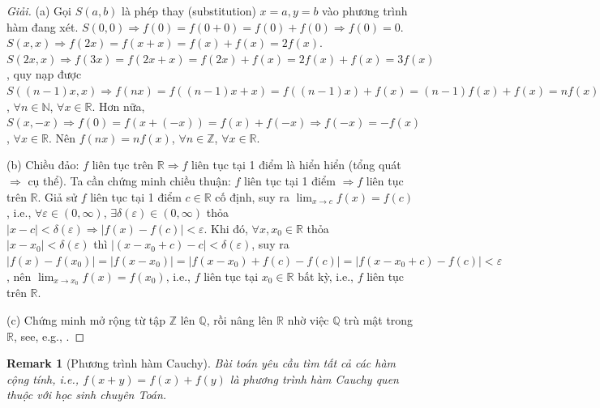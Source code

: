 \documentclass{article}
\newtheorem{remark}{Remark}
\begin{document}
\begin{proof}[Giải]
	(a) Gọi $S(a,b)$ là phép thay (substitution) $x = a,y = b$ vào phương trình hàm đang xét. $S(0,0)\Rightarrow f(0) = f(0 + 0) = f(0) + f(0)\Rightarrow f(0) = 0$. $S(x,x)\Rightarrow f(2x) = f(x + x) = f(x) + f(x) = 2f(x)$. $S(2x,x)\Rightarrow f(3x) = f(2x + x) = f(2x) + f(x) = 2f(x) + f(x) = 3f(x)$, quy nạp được $S((n - 1)x,x)\Rightarrow  f(nx) = f((n - 1)x + x) = f((n - 1)x) + f(x) = (n - 1)f(x) + f(x) = nf(x)$, $\forall n\in\mathbb{N}$, $\forall x\in\mathbb{R}$. Hơn nữa, $S(x,-x)\Rightarrow f(0) = f(x + (-x)) = f(x) + f(-x)\Rightarrow f(-x) = -f(x)$, $\forall x\in\mathbb{R}$. Nên $f(nx) = nf(x)$, $\forall n\in\mathbb{Z}$, $\forall x\in\mathbb{R}$.
	\item(b) Chiều đảo: $f$ liên tục trên $\mathbb{R}\Rightarrow f$ liên tục tại 1 điểm là hiển hiển (tổng quát $\Rightarrow$ cụ thể). Ta cần chứng minh chiều thuận: $f$ liên tục tại 1 điểm $\Rightarrow f$ liên tục trên $\mathbb{R}$. Giả sử $f$ liên tục tại 1 điểm $c\in\mathbb{R}$ cố định, suy ra $\lim_{x\to c} f(x) = f(c)$, i.e., $\forall\varepsilon\in(0,\infty)$, $\exists\delta(\varepsilon)\in(0,\infty)$ thỏa $|x - c| < \delta(\varepsilon)\Rightarrow|f(x) - f(c)| < \varepsilon$. Khi đó, $\forall x,x_0\in\mathbb{R}$ thỏa $|x - x_0| < \delta(\varepsilon)$ thì $|(x - x_0 + c) - c| < \delta(\varepsilon)$, suy ra $|f(x) - f(x_0)| = |f(x - x_0)| = |f(x - x_0) + f(c) - f(c)| = |f(x - x_0 + c) - f(c)| < \varepsilon$, nên $\lim_{x\to x_0} f(x) = f(x_0)$, i.e., $f$ liên tục tại $x_0\in\mathbb{R}$ bất kỳ, i.e., $f$ liên tục trên $\mathbb{R}$.
	\item(c) Chứng minh mở rộng từ tập $\mathbb{Z}$ lên $\mathbb{Q}$, rồi nâng lên $\mathbb{R}$ nhờ việc $\mathbb{Q}$ trù mật trong $\mathbb{R}$, see, e.g., \cite{Chung_day_so, Chung_pth_da_thuc}.
\end{proof}

\begin{remark}[Phương trình hàm Cauchy]
	Bài toán yêu cầu tìm tất cả các hàm cộng tính, i.e., $f(x + y) = f(x) + f(y)$ là phương trình hàm Cauchy quen thuộc với học sinh chuyên Toán.
\end{remark}
\end{document}
